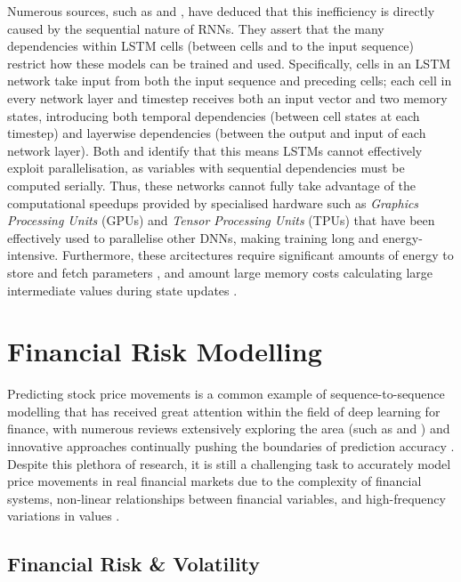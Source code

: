 \documentclass[a4paper, 11pt]{report}
\begin{document}
    Numerous sources, such as \citet{cao-2017} and \citet{feliz-2021}, have deduced that this inefficiency is directly caused by the sequential nature of RNNs. They assert that the many dependencies within LSTM cells (between cells and to the input sequence) restrict how these models can be trained and used. Specifically, cells in an LSTM network take input from both the input sequence and preceding cells; each cell in every network layer and timestep receives both an input vector and two memory states, introducing both temporal dependencies (between cell states at each timestep) and layerwise dependencies (between the output and input of each network layer). Both \citet{cao-2017} and \citet{feliz-2021} identify that this means LSTMs cannot effectively exploit parallelisation, as variables with sequential dependencies must be computed serially. Thus, these networks cannot fully take advantage of the computational speedups provided by specialised hardware such as \emph{Graphics Processing Units} (GPUs) and \emph{Tensor Processing Units} (TPUs) that have been effectively used to parallelise other DNNs, making training long and energy-intensive. Furthermore, these arcitectures require significant amounts of energy to store and fetch parameters \citep{feliz-2021}, and amount large memory costs calculating large intermediate values during state updates \citep{cao-2017}.


    \section{Financial Risk Modelling}

    Predicting stock price movements is a common example of sequence-to-sequence modelling that has received great attention within the field of deep learning for finance, with numerous reviews extensively exploring the area (such as \citet{sezer-2019} and \citet{jiang-2021}) and innovative approaches continually pushing the boundaries of prediction accuracy \citep{darapaneni-2022}. Despite this plethora of research, it is still a challenging task to accurately model price movements in real financial markets due to the complexity of financial systems, non-linear relationships between financial variables, and high-frequency variations in values \citep{timmermann-2004}.


    \subsection{Financial Risk \& Volatility}
\end{document}
